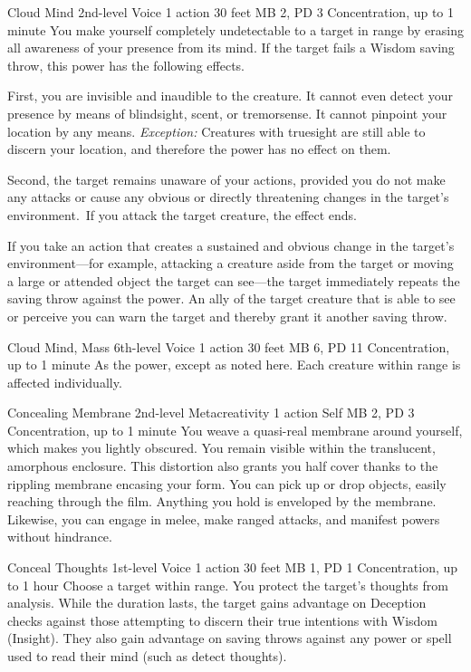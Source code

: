 \DndPowerHeader%
  {Cloud Mind}
  {2nd-level Voice}
  {1 action}
  {30 feet}
  {MB 2, PD 3}
  {Concentration, up to 1 minute}
You make yourself completely undetectable to a target in range
by erasing all awareness of your presence from its mind.
If the target fails a Wisdom saving throw,
this power has the following effects.

First, you are invisible and inaudible to the creature.
It cannot even detect your presence by means of blindsight,
scent, or tremorsense.
It cannot pinpoint your location by any means.
\textit{Exception:} Creatures with truesight are still
able to discern your location,
and therefore the power has no effect on them.
  
Second, the target remains unaware of your actions,
provided you do not make any attacks or cause any obvious
or directly threatening changes in the target's environment.\
If you attack the target creature, the effect ends.
  
If you take an action that creates a sustained and obvious change
in the target's environment---for example, attacking a creature
aside from the target or moving a large or attended object
the target can see---the target immediately repeats the
saving throw against the power.
An ally of the target creature that is able to see or perceive you
can warn the target and thereby grant it another saving throw.

\DndPowerHeader%
  {Cloud Mind, Mass}
  {6th-level Voice}
  {1 action}
  {30 feet}
  {MB 6, PD 11}
  {Concentration, up to 1 minute}
As the  power,
except as noted here.
Each creature within range is affected individually.

\DndPowerHeader%
  {Concealing Membrane}
  {2nd-level Metacreativity}
  {1 action}
  {Self}
  {MB 2, PD 3}
  {Concentration, up to 1 minute}
  You weave a quasi-real membrane around yourself,
  which makes you lightly obscured.
  You remain visible within the translucent, amorphous enclosure.
  This distortion also grants you half cover
  thanks to the rippling membrane encasing your form.
  You can pick up or drop objects, easily reaching through the film.
  Anything you hold is enveloped by the membrane.
  Likewise, you can engage in melee, make ranged attacks,
  and manifest powers without hindrance.

\DndPowerHeader%
  {Conceal Thoughts}
  {1st-level Voice}
  {1 action}
  {30 feet}
  {MB 1, PD 1}
  {Concentration, up to 1 hour}
Choose a target within range.
You protect the target's thoughts from analysis.
While the duration lasts, the target gains advantage on
Deception checks against those attempting to discern their
true intentions with Wisdom (Insight).
They also gain advantage on saving throws against any power or spell
used to read their mind (such as detect thoughts).

